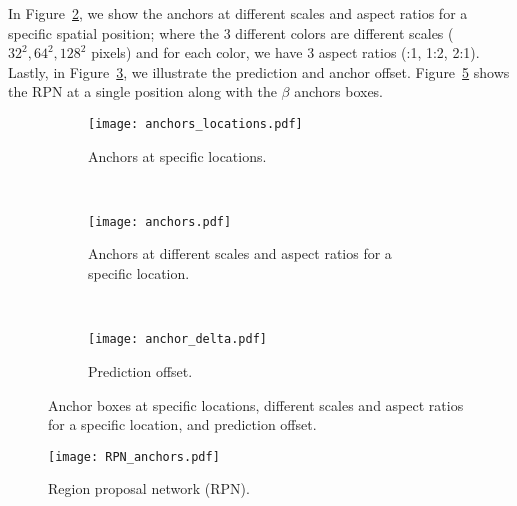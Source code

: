 In Figure~\ref{fig:anchors_b}, we show the anchors at different scales and aspect ratios for a specific spatial position;
where the 3 different colors are different scales (\eg $32^2, 64^2, 128^2$ pixels) and for each color, we have 3 aspect ratios (:1, 1:2, 2:1).
Lastly, in Figure~\ref{fig:anchors_c}, we illustrate the prediction and anchor offset.
%
Figure~\ref{fig:rpn} shows the RPN at a single position along with the $\beta$ anchors boxes.
%
\begin{figure}[th!]
  \centering
  \begin{subfigure}[t]{0.49\linewidth}
    \centering
    \texttt{[image: anchors\_locations.pdf]}
    \caption{Anchors at specific locations.}
    \label{fig:anchors_a}
  \end{subfigure}~
  \begin{subfigure}[b]{0.49\linewidth}
    \centering
    \texttt{[image: anchors.pdf]}
    \caption{Anchors at different scales and aspect ratios for a specific location.}
    \label{fig:anchors_b}
  \end{subfigure}\\
  \begin{subfigure}[b]{0.49\linewidth}
    \centering
    \texttt{[image: anchor\_delta.pdf]}
    \caption{Prediction offset.}
    \label{fig:anchors_c}
  \end{subfigure}
  \caption{Anchor boxes at specific locations, different scales and aspect ratios for a specific location, and prediction offset.}
  \label{fig:anchors}
\end{figure}

%

%
\begin{figure}[th!]
	\centering
	\texttt{[image: RPN\_anchors.pdf]}
	\caption{Region proposal network (RPN).}
	\label{fig:rpn}
\end{figure}

%
